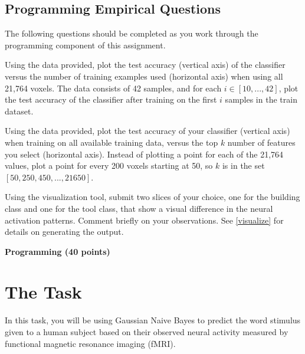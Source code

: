 \documentclass[11pt,addpoints,answers]{exam}
\begin{document}
\begin{questions}
\section{Programming Empirical Questions}

The following questions should be completed as you work through the programming component of this assignment.

\begin{questions}

\question[3] Using the data provided, plot the test accuracy (vertical axis) of the classifier versus the number of training examples used (horizontal axis) when using all 21,764 voxels. The data consists of 42 samples, and for each $i \in [10,...,42]$, plot the test accuracy of the classifier after training on the first $i$ samples in the train dataset.

\begin{your_solution}[title=Your Answer:,height=10cm,width=15cm]
\end{your_solution}

\clearpage

\question[3] Using the data provided, plot the test accuracy of your classifier (vertical axis) when training on all available training data, versus the top $k$ number of features you select (horizontal axis). Instead of plotting a point for each of the 21,764 values, plot a point for every 200 voxels starting at 50, so $k$ is in the set $[50,250,450,...,21650]$.

\begin{your_solution}[title=Your Answer:,height=10cm,width=15cm]
\end{your_solution}

\clearpage

\question[2] Using the visualization tool, submit two slices of your choice, one for the building class and one for the tool class, that show a visual difference in the neural activation patterns. Comment briefly on your observations. See \ref{visualize} for details on generating the output. 

\begin{your_solution}[title=Your Answer:,height=18cm,width=15cm]
\end{your_solution}

\end{questions}
\newpage
\end{questions}

{\LARGE \bf Programming (40 points)}


\section{The Task}
In this task, you will be using Gaussian Naive Bayes to predict the word stimulus given to a human subject based on their observed neural activity measured by functional magnetic resonance imaging (fMRI). 
\end{document}
